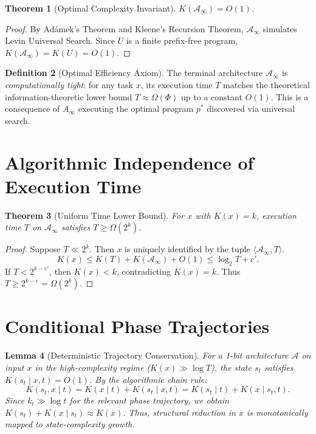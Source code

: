 \documentclass[12pt,a4paper]{article}
\theoremstyle{plain}
\newtheorem{theorem}{Theorem}[section]
\newtheorem{lemma}[theorem]{Lemma}
\theoremstyle{definition}
\newtheorem{definition}[theorem]{Definition}
\begin{document}
\begin{theorem}[Optimal Complexity Invariant]
$K(\mathcal{A}_\infty) = O(1)$.
\end{theorem}
\begin{proof}
By Ad\'amek's Theorem and Kleene's Recursion Theorem, $\mathcal{A}_\infty$ simulates Levin Universal Search. Since $U$ is a finite prefix-free program, $K(\mathcal{A}_\infty) = K(U) = O(1)$.
\end{proof}

\begin{definition}[Optimal Efficiency Axiom]
The terminal architecture $\mathcal{A}_\infty$ is \textit{computationally tight}: for any task $x$, its execution time $T$ matches the theoretical information-theoretic lower bound $T \approx \Omega(\Phi)$ up to a constant $O(1)$. This is a consequence of $A_\infty$ executing the optimal program $p^*$ discovered via universal search.
\end{definition}

\section{Algorithmic Independence of Execution Time}

\begin{theorem}[Uniform Time Lower Bound]
For $x$ with $K(x)=k$, execution time $T$ on $\mathcal{A}_\infty$ satisfies $T \ge \Omega(2^k)$.
\end{theorem}
\begin{proof}
Suppose $T \ll 2^k$. Then $x$ is uniquely identified by the tuple $\langle \mathcal{A}_\infty, T \rangle$. 
\begin{equation}
K(x) \le K(T) + K(\mathcal{A}_\infty) + O(1) \le \log_2 T + c'.
\end{equation}
If $T < 2^{k-c'}$, then $K(x) < k$, contradicting $K(x)=k$. Thus $T \ge 2^{k-c} = \Omega(2^k)$.
\end{proof}

\section{Conditional Phase Trajectories}

\begin{lemma}[Deterministic Trajectory Conservation]
For a 1-bit architecture $\mathcal{A}$ on input $x$ in the high-complexity regime ($K(x) \gg \log T$), the state $s_t$ satisfies $K(s_t \mid x, t) = O(1)$. By the algorithmic chain rule:
\begin{equation}
K(s_t, x \mid t) = K(x \mid t) + K(s_t \mid x, t) = K(s_t \mid t) + K(x \mid s_t, t).
\end{equation}
Since $k_t \gg \log t$ for the relevant phase trajectory, we obtain $K(s_t) + K(x \mid s_t) \approx K(x)$. Thus, structural reduction in $x$ is monotonically mapped to state-complexity growth.
\end{lemma}
\end{document}
